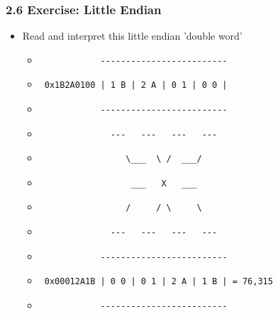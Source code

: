 \begin{frame}[fragile]
  \frametitle{2.6 Exercise: Little Endian}
    \begin{itemize}
        \item[] Read and interpret this little endian 'double word'
            \begin{itemize}
                \item[] \begin{verbatim}            ------------------------- \end{verbatim}
                \item[] \begin{verbatim} 0x1B2A0100 | 1 B | 2 A | 0 1 | 0 0 | \end{verbatim}
                \item[] \begin{verbatim}            ------------------------- \end{verbatim}
                \item[] \begin{verbatim}              ---   ---   ---   ---   \end{verbatim}
                \item[] \begin{verbatim}                 \___  \ /  ___/      \end{verbatim}
                \item[] \begin{verbatim}                  ___   X   ___       \end{verbatim}
                \item[] \begin{verbatim}                 /     / \     \      \end{verbatim}
                \item[] \begin{verbatim}              ---   ---   ---   ---   \end{verbatim}
                \item[] \begin{verbatim}            ------------------------- \end{verbatim}
                \item[] \begin{verbatim} 0x00012A1B | 0 0 | 0 1 | 2 A | 1 B | = 76,315 \end{verbatim}
                \item[] \begin{verbatim}            ------------------------- \end{verbatim}
            \end{itemize}
    \end{itemize}
\end{frame}


